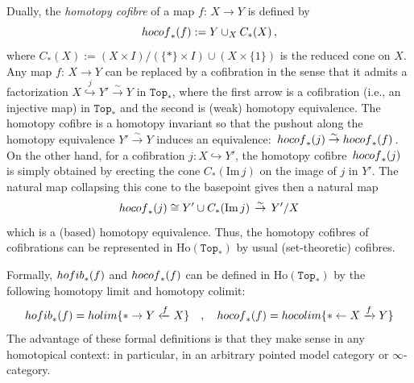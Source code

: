 \documentclass[11pt]{amsart}
\theoremstyle{definition}
\theoremstyle{remark}
\numberwithin{equation}{section}
\newcommand{\la}{\label}
\newcommand{\Ho}{\mathrm{Ho}}
\newcommand{\into}{\hookrightarrow}
\newcommand{\Top}{\mathtt{Top}}
\def\im{\mathrm{Im}}
\begin{document}
Dually, the {\it homotopy cofibre} of a map $ f: \,X \to Y $ is defined by
%
$$
{\rm hocof}_*(f) := Y \cup_{X} C_*(X)\, ,
$$
%
where $ C_*(X) := (X \times I)/(\{*\} \times I) \cup (X \times \{1\}) $ is the reduced cone on $X$. 
Any map $ f: \,X \to Y $ can be replaced by a cofibration in the sense that it admits a factorization
$ X \stackrel{j}{\into} Y' \stackrel{\sim}{\to} Y $ in $ \Top_* $, where the first arrow is a cofibration (i.e., an injective map) in $ \Top_* $ and the second is (weak) homotopy equivalence. The homotopy cofibre is a homotopy invariant so that the pushout along the homotopy equivalence  $ Y' \stackrel{\sim}{\to} Y $ induces an equivalence: $\,{\rm hocof}_*(j) \stackrel{\sim}{\to} {\rm hocof}_*(f) \,$. On the other hand, for a cofibration $ j: X \into Y' $, the homotopy cofibre $\, {\rm hocof}_*(j)\, $ is simply obtained by erecting the cone $ C_*(\im \,j) $ on the image of $ j $ in $ Y' $. The natural map collapsing this cone to the basepoint gives then a natural map
%
$$
{\rm hocof}_*(j) \cong Y' \cup C_*(\im\, j) \,\stackrel{\sim}{\to} \,Y'/X
$$
%
which is a (based) homotopy equivalence. Thus, the homotopy cofibres of cofibrations can be represented in $ \Ho(\Top_*) $ by usual (set-theoretic) cofibres.

Formally, $ {\rm hofib}_*(f) $ and  $ {\rm hocof}_*(f) $ can be defined in $\Ho(\Top_*)$ by the following homotopy limit and homotopy colimit:
%
\begin{equation}
\la{limcolim}
{\rm hofib}_*(f) = {\rm holim}\{\ast \to Y \xleftarrow{f} X\}\quad , \quad
{\rm hocof}_*(f) = {\rm hocolim}\{\ast \leftarrow X \xrightarrow{f} Y\}
\end{equation}
%
The advantage of these formal definitions is that they make sense in any homotopical context: in particular, in an arbitrary pointed model category or $\infty$-category.
\end{document}

